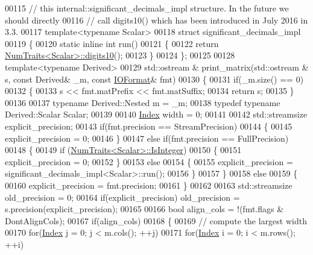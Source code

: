 \begin{DoxyCode}
00115 \textcolor{comment}{//       this internal::significant\_decimals\_impl structure. In the future we should directly}
00116 \textcolor{comment}{//       call digits10() which has been introduced in July 2016 in 3.3.}
00117 \textcolor{keyword}{template}<\textcolor{keyword}{typename} Scalar>
00118 \textcolor{keyword}{struct }significant\_decimals\_impl
00119 \{
00120   \textcolor{keyword}{static} \textcolor{keyword}{inline} \textcolor{keywordtype}{int} run()
00121   \{
00122     \textcolor{keywordflow}{return} \hyperlink{group___core___module_struct_eigen_1_1_num_traits}{NumTraits<Scalar>::digits10}();
00123   \}
00124 \};
00125 
00128 \textcolor{keyword}{template}<\textcolor{keyword}{typename} Derived>
00129 std::ostream & print\_matrix(std::ostream & s, \textcolor{keyword}{const} Derived& \_m, \textcolor{keyword}{const} \hyperlink{group___core___module_struct_eigen_1_1_i_o_format}{IOFormat}& fmt)
00130 \{
00131   \textcolor{keywordflow}{if}(\_m.size() == 0)
00132   \{
00133     s << fmt.matPrefix << fmt.matSuffix;
00134     \textcolor{keywordflow}{return} s;
00135   \}
00136   
00137   \textcolor{keyword}{typename} Derived::Nested m = \_m;
00138   \textcolor{keyword}{typedef} \textcolor{keyword}{typename} Derived::Scalar Scalar;
00139 
00140   \hyperlink{namespace_eigen_a62e77e0933482dafde8fe197d9a2cfde}{Index} width = 0;
00141 
00142   std::streamsize explicit\_precision;
00143   \textcolor{keywordflow}{if}(fmt.precision == StreamPrecision)
00144   \{
00145     explicit\_precision = 0;
00146   \}
00147   \textcolor{keywordflow}{else} \textcolor{keywordflow}{if}(fmt.precision == FullPrecision)
00148   \{
00149     \textcolor{keywordflow}{if} (\hyperlink{group___core___module_struct_eigen_1_1_num_traits}{NumTraits<Scalar>::IsInteger})
00150     \{
00151       explicit\_precision = 0;
00152     \}
00153     \textcolor{keywordflow}{else}
00154     \{
00155       explicit\_precision = significant\_decimals\_impl<Scalar>::run();
00156     \}
00157   \}
00158   \textcolor{keywordflow}{else}
00159   \{
00160     explicit\_precision = fmt.precision;
00161   \}
00162 
00163   std::streamsize old\_precision = 0;
00164   \textcolor{keywordflow}{if}(explicit\_precision) old\_precision = s.precision(explicit\_precision);
00165 
00166   \textcolor{keywordtype}{bool} align\_cols = !(fmt.flags & DontAlignCols);
00167   \textcolor{keywordflow}{if}(align\_cols)
00168   \{
00169     \textcolor{comment}{// compute the largest width}
00170     \textcolor{keywordflow}{for}(\hyperlink{namespace_eigen_a62e77e0933482dafde8fe197d9a2cfde}{Index} j = 0; j < m.cols(); ++j)
00171       \textcolor{keywordflow}{for}(\hyperlink{namespace_eigen_a62e77e0933482dafde8fe197d9a2cfde}{Index} i = 0; i < m.rows(); ++i)

\end{DoxyCode}
